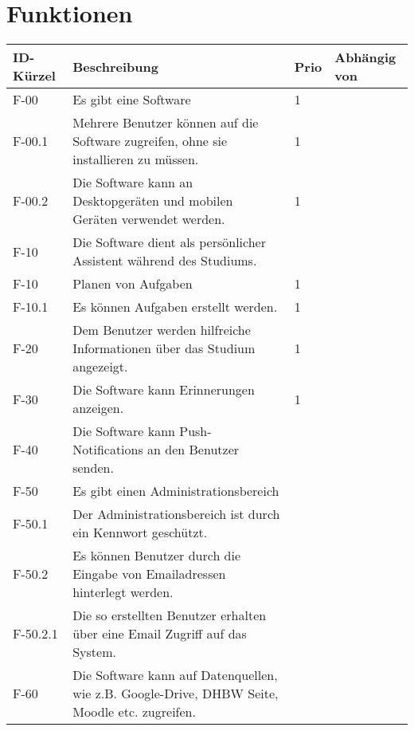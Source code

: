 \chapter{Funktionen}


\begin{table}[H]
    \label{Funktionen::main}
    \begin{longtable}{|l|l|l|l}
        \toprule
        \textbf{ID-Kürzel} & \textbf{Beschreibung} & \textbf{Prio} & \textbf{Abhängig von} \\
        \endhead
        \hline
        F-00 & Es gibt eine Software & 1 & \\
        F-00.1 & Mehrere Benutzer können auf die Software zugreifen, ohne sie installieren zu müssen. & 1 & \\
        F-00.2 & Die Software kann an Desktopgeräten und mobilen Geräten verwendet werden. & 1 & \\
        \hline
        F-10 & Die Software dient als persönlicher Assistent während des Studiums. & & \\
        F-10 & Planen von Aufgaben & 1 & \\
        F-10.1 & Es können Aufgaben erstellt werden. & 1 & \\

        F-20 & Dem Benutzer werden hilfreiche Informationen über das Studium angezeigt. & 1 & \\

        F-30 & Die Software kann Erinnerungen anzeigen. & 1 & \\

        F-40 & Die Software kann Push-Notifications an den Benutzer senden. & & \\

        F-50 & Es gibt einen Administrationsbereich & & \\
        F-50.1 & Der Administrationsbereich ist durch ein Kennwort geschützt. & & \\ %
        F-50.2 & Es können Benutzer durch die Eingabe von Emailadressen hinterlegt werden. & & \\
        F-50.2.1 & Die so erstellten Benutzer erhalten über eine Email Zugriff auf das System. & & \\ %
        
        F-60 & Die Software kann auf Datenquellen, wie z.B. Google-Drive, DHBW Seite, Moodle etc. zugreifen. & & \\


\end{longtable}
\end{table}
